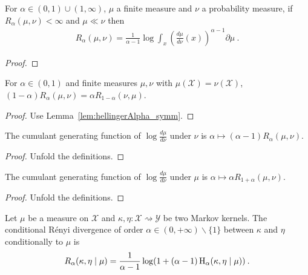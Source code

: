 \begin{lemma}
  \label{lem:renyi_eq_log_integral'}
  \leanok
  For $\alpha \in (0,1)\cup(1, \infty)$, $\mu$ a finite measure and $\nu$ a probability measure, if $R_\alpha(\mu, \nu) < \infty$ and $\mu \ll \nu$ then
  \begin{align*}
  R_\alpha(\mu, \nu) = \frac{1}{\alpha - 1} \log \int_x \left(\frac{d \mu}{d \nu}(x)\right)^{\alpha - 1} \partial \mu
  \: .
  \end{align*}
\end{lemma}

\begin{proof}\leanok
{}
\end{proof}

\begin{lemma}
  \label{lem:renyi_symm}
  \leanok
  For $\alpha \in (0, 1)$ and finite measures $\mu, \nu$ with $\mu(\mathcal X) = \nu(\mathcal X)$, $(1 - \alpha) R_\alpha(\mu, \nu) = \alpha R_{1 - \alpha}(\nu, \mu)$.
\end{lemma}

\begin{proof}\leanok
{}
Use Lemma~\ref{lem:hellingerAlpha_symm}.
\end{proof}

\begin{lemma}
  \label{lem:renyi_cgf}
  The cumulant generating function of $\log\frac{d\mu}{d\nu}$ under $\nu$ is $\alpha \mapsto (\alpha - 1) R_\alpha(\mu, \nu)$.
\end{lemma}

\begin{proof}
Unfold the definitions.
\end{proof}

\begin{lemma}
  \label{lem:renyi_cgf_2}
  The cumulant generating function of $\log\frac{d\mu}{d\nu}$ under $\mu$ is $\alpha \mapsto \alpha R_{1+\alpha}(\mu, \nu)$.
\end{lemma}

\begin{proof}
Unfold the definitions.
\end{proof}

\begin{definition}
  \label{def:condRenyi}
  Let $\mu$ be a measure on $\mathcal X$ and $\kappa, \eta : \mathcal X \rightsquigarrow \mathcal Y$ be two Markov kernels. The conditional Rényi divergence of order $\alpha \in (0,+\infty) \backslash \{1\}$ between $\kappa$ and $\eta$ conditionally to $\mu$ is
  \begin{align*}
  R_\alpha(\kappa, \eta \mid \mu) =\frac{1}{\alpha - 1} \log (1 + (\alpha - 1) \operatorname{H}_\alpha(\kappa, \eta \mid \mu)) \: .
  \end{align*}
\end{definition}

